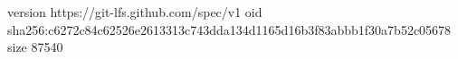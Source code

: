 version https://git-lfs.github.com/spec/v1
oid sha256:c6272c84c62526e2613313c743dda134d1165d16b3f83abbb1f30a7b52c05678
size 87540
